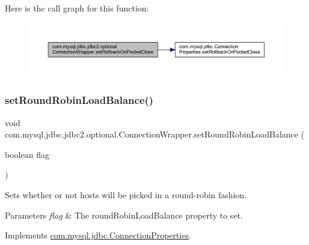 Here is the call graph for this function\+:
\nopagebreak
\begin{figure}[H]
\begin{center}
\leavevmode
\includegraphics[width=350pt]{classcom_1_1mysql_1_1jdbc_1_1jdbc2_1_1optional_1_1_connection_wrapper_a9d43b30760d413e9c1278f85a7f63349_cgraph}
\end{center}
\end{figure}
\mbox{\label{classcom_1_1mysql_1_1jdbc_1_1jdbc2_1_1optional_1_1_connection_wrapper_a443c2aa5fdc8084aa721378f69257562}} 
\subsubsection{\texorpdfstring{set\+Round\+Robin\+Load\+Balance()}{setRoundRobinLoadBalance()}}
{\footnotesize\ttfamily void com.\+mysql.\+jdbc.\+jdbc2.\+optional.\+Connection\+Wrapper.\+set\+Round\+Robin\+Load\+Balance (\begin{DoxyParamCaption}\item[{boolean}]{flag }\end{DoxyParamCaption})}

Sets whether or not hosts will be picked in a round-\/robin fashion.


\begin{DoxyParams}{Parameters}
{\em flag} & The round\+Robin\+Load\+Balance property to set. \\
\hline
\end{DoxyParams}


Implements \mbox{\hyperlink{interfacecom_1_1mysql_1_1jdbc_1_1_connection_properties_a13ef9e49985c436e69d1a8ed5eb095c6}{com.\+mysql.\+jdbc.\+Connection\+Properties}}.

